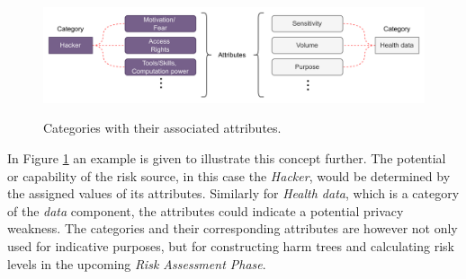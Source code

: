 \begin{figure}[hbt!]
  \centering
  \includegraphics[width=\textwidth]{pictures/cat_att.png}
  \caption{}{Categories with their associated attributes.}
  \label{fig:cat_att}
\end{figure}

In Figure \ref{fig:cat_att} an example is given to illustrate this concept
further. The potential or capability of the risk source, in this case the
\textit{Hacker}, would be determined by the assigned values of its attributes.
Similarly for \textit{Health data}, which is a category of the \textit{data}
component, the attributes could indicate a potential privacy weakness. The
categories and their corresponding attributes are however not only used for
indicative purposes, but for constructing harm trees and calculating risk levels
in the upcoming \textit{Risk Assessment Phase}.

